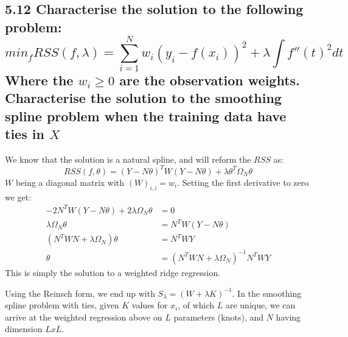 \subsection*{5.12 
Characterise the solution to the following problem:
$$ min_f RSS(f, \lambda) = \sum_{i=1}^N w_i \left( y_i - f(x_i)\right)^2 + \lambda \int f''(t)^2 dt $$
Where the $w_i \geq 0$ are the observation weights. Characterise the solution to the smoothing spline problem when the training data have ties in $X$}

We know that the solution is a natural spline, and will reform the $RSS$ as:
$$RSS(f, \theta) = \left(Y - N\theta \right)^T W \left(Y - N\theta\right) + \lambda \theta^T \Omega_N \theta$$
$W$ being a diagonal matrix with $(W)_{i,i} = w_i$.
Setting the first derivative to zero we get:
\begin{align*}
-2 N^T W \left(Y - N\theta\right) + 2 \lambda \Omega_N \theta &= 0\\
\lambda \Omega_N \theta  &= N^T W \left(Y - N\theta\right)\\
\left( N^T W N + \lambda \Omega_N\right) \theta &= N^T W Y \\
 \theta &= \left( N^T W N + \lambda \Omega_N\right)^{-1} N^T W Y 
\end{align*}
This is simply the solution to a weighted ridge regression.

Using the Reinsch form, we end up with $S_\lambda = \left( W + \lambda K \right)^{-1}$.
In the smoothing spline problem with ties, given $K$ values for $x_i$, of which $L$ are unique, we can arrive at the weighted regression above on $L$ parameters (knots), and $N$ having dimension $L x L$.
